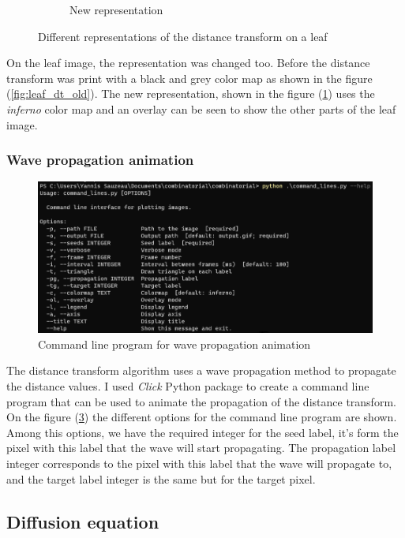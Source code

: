 \begin{figure}[ht]
\begin{subfigure}{0.54\textwidth}
        \caption{New representation}
        \label{fig:leaf_dt_new}
    \end{subfigure}
    \caption{Different representations of the distance transform on a leaf}
    \label{fig:leaf_dt}
\end{figure}

On the leaf image, the representation was changed too. Before the distance transform
was print with a black and grey color map as shown in the figure (\ref{fig:leaf_dt_old}). 
The new representation, shown in the figure (\ref{fig:leaf_dt_new}) uses the 
\textit{inferno} color map and an overlay can be seen to show the other parts of the 
leaf image.

\subsubsection{Wave propagation animation}

\begin{figure}[ht]
    \centering
    \includegraphics[width=\textwidth]{figures/cli.png}
    \caption{Command line program for wave propagation animation}
    \label{fig:cli}
\end{figure}

The distance transform algorithm uses a wave propagation method to propagate the
distance values. I used \textit{Click} \cite{CLICK} Python package to create a
command line program that can be used to animate the propagation of the distance
transform. On the figure (\ref{fig:cli}) the different options for the command line
program are shown. Among this options, we have the required integer for the seed
label, it's form the pixel with this label that the wave will start propagating.
The propagation label integer corresponds to the pixel with this label that the wave
will propagate to, and the target label integer is the same but for the target pixel.

\subsection{Diffusion equation}

